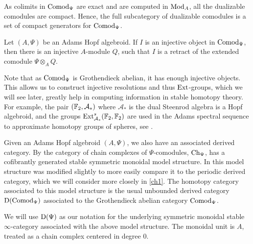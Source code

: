 \begin{remark}
    \label{ch0:rm:dualizables-compact-generators}
    As colimits in $\mathrm{Comod}_\Psi$ are exact and are computed in $\mathrm{Mod}_A$, all the dualizable comodules are compact. Hence, the full subcategory of dualizable comodules is a set of compact generators for $\mathrm{Comod}_\Psi$. 
\end{remark}

\begin{proposition}
    \label{ch0:rm:injective-comodules}
    Let $(A, \Psi)$ be an Adams Hopf algebroid. If $I$ is an injective object in $\mathrm{Comod}_\Psi$, then there is an injective $A$-module $Q$, such that $I$ is a retract of the extended comodule $\Psi\otimes_A Q$. 
\end{proposition}

\begin{remark}
    Note that as $\mathrm{Comod}_{\Psi}$ is Grothendieck abelian, it has enough injective objects. This allows us to construct injective resolutions and thus $\operatorname{Ext}$-groups, which we will see later, greatly help in computing information in stable homotopy theory. For example, the pair $(\mathbb{F}_2, \mathcal{A}_*)$ where $\mathcal{A}_*$ is the dual Steenrod algebra is a Hopf algebroid, and the groups $\operatorname{Ext}^s_{\mathcal{A}_*}(\mathbb{F}_2, \mathbb{F}_2)$ are used in the Adams spectral sequence to approximate homotopy groups of spheres, see \cite{adams_58}. 
\end{remark}

Given an Adams Hopf algebroid $(A, \Psi)$, we also have an associated derived category. By \cite[2.1.2, 2.1.3]{hovey_04} the category of chain complexes of $\Psi$-comodules, $\mathrm{Ch}_\Psi$, has a cofibrantly generated stable symmetric monoidal model structure. In \cite{barnes-roitzheim_2011} this model structure was modified slightly to more easily compare it to the periodic derived category, which we will consider more closely in \cref{ch1}. The homotopy category associated to this model structure is the usual unbounded derived category $\mathrm{D}(\mathrm{Comod}_\Psi)$ associated to the Grothendieck abelian category $\mathrm{Comod}_\Psi$. 

\begin{notation}
    We will use $\mathrm{D}(\Psi)$ as our notation for the underlying symmetric monoidal stable $\infty$-category associated with the above model structure. The monoidal unit is $A$, treated as a chain complex centered in degree $0$.
\end{notation}

